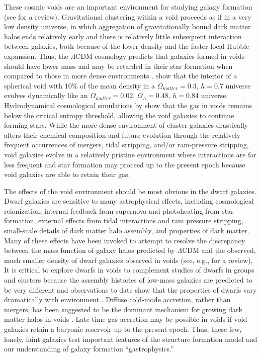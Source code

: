 
These cosmic voids are an important environment for studying galaxy formation 
(see \cite{vandeWeygaert11} for a review).  Gravitational clustering within a 
void proceeds as if in a very low density universe, in which aggregation of 
gravitationally bound dark matter halos ends relatively early and there is 
relatively little subsequent interaction between galaxies, both because of the 
lower density and the faster local Hubble expansion.  Thus, the $\Lambda$CDM 
cosmology predicts that galaxies formed in voids should have lower mass and may 
be retarded in their star formation when compared to those in more dense 
environments \citep[e.g.,][]{Gottlober03, Goldberg05, Cen11}.  \cite{Goldberg04} 
show that the interior of a spherical void with 10\% of the mean density in a 
$\Omega_{matter} = 0.3$, $h = 0.7$ universe evolves dynamically like an 
$\Omega_{matter} = 0.02$, $\Omega_{\Lambda} = 0.48$, $h = 0.84$ universe.  
Hydrodynamical cosmological simulations by \cite{Cen11} show that the gas in 
voids remains below the critical entropy threshold, allowing the void galaxies 
to continue forming stars.  While the more dense environment of cluster galaxies 
drastically alters their chemical composition and future evolution through the 
relatively frequent occurrences of mergers, tidal stripping, and/or ram-pressure 
stripping, void galaxies evolve in a relatively pristine environment where 
interactions are far less frequent and star formation may proceed up to the 
present epoch because void galaxies are able to retain their gas.

 
The effects of the void environment should be most obvious in the dwarf 
galaxies.  Dwarf galaxies are sensitive to many astrophysical effects, including 
cosmological reionization, internal feedback from supernova and photoheating 
from star formation, external effects from tidal interactions and ram pressure 
stripping, small-scale details of dark matter halo assembly, and properties of 
dark matter. Many of these effects have been invoked to attempt to resolve the 
discrepancy between the mass function of galaxy halos predicted by $\Lambda$CDM 
and the observed, much smaller density of dwarf galaxies observed in voids (see, 
e.g., \cite{Kravtsov09} for a review).  It is critical to explore dwarfs in 
voids to complement studies of dwarfs in groups and clusters because the 
assembly histories of low-mass galaxies are predicted to be very different 
\citep[e.g.,][]{Gao07, Lackner12} and observations to date show that the 
properties of dwarfs vary dramatically with environment \citep[e.g.,][]{Ann08, 
Geha12}.  Diffuse cold-mode accretion, rather than mergers, has been suggested 
to be the dominant mechanism for growing dark matter halos in voids 
\citep[e.g.,][]{Keres05, Fakhouri09}.  Late-time gas accretion may be possible 
in voids if void galaxies retain a baryonic reservoir up to the present epoch.  
Thus, these few, lonely, faint galaxies test important features of the structure 
formation model and our understanding of galaxy formation ``gastrophysics.''

